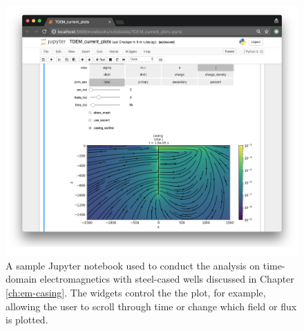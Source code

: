 \begin{figure}
    \begin{center}
    \includegraphics[width=\textwidth]{figures/education/research_gui.png}
    \end{center}
\caption{
    A sample Jupyter notebook used to conduct the analysis
    on time-domain electromagnetics with steel-cased wells
    discussed in Chapter \ref{ch:em-casing}. The widgets control the
    the plot, for example, allowing the user to scroll through time or change which field or flux is plotted.
}
\label{fig:research_gui}
\end{figure}



